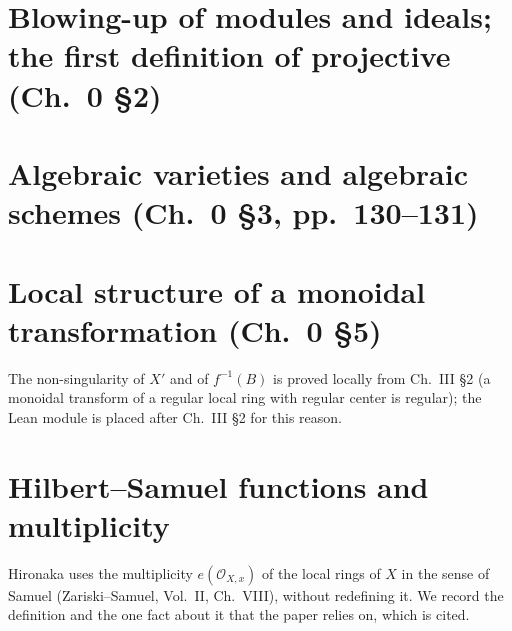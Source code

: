 \section{Blowing-up of modules and ideals; the first definition of projective (Ch.~0 \S2)}

\section{Algebraic varieties and algebraic schemes (Ch.~0 \S3, pp.~130--131)}

\section{Local structure of a monoidal transformation (Ch.~0 \S5)}

The non-singularity of $X'$ and of $f^{-1}(B)$ is proved locally from Ch.~III \S2 (a monoidal
transform of a regular local ring with regular center is regular); the Lean module is placed
after Ch.~III \S2 for this reason.


\section{Hilbert--Samuel functions and multiplicity}

Hironaka uses the multiplicity $e(\mathcal O_{X,x})$ of the local rings of $X$ in the sense of
Samuel (Zariski--Samuel, Vol.~II, Ch.~VIII), without redefining it.  We record the definition
and the one fact about it that the paper relies on, which is cited.

